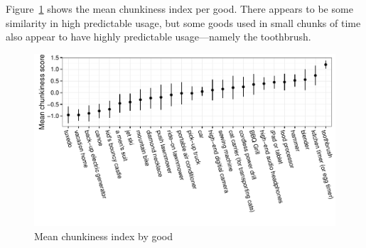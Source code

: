 \documentclass[12pt]{article}
\begin{document}
Figure~\ref{fig:granularity} shows the mean chunkiness index per good. 
There appears to be some similarity in high predictable usage, but some goods used in small chunks of time also appear to have highly predictable usage---namely the toothbrush. 

\begin{figure}
\centering 
\caption{Mean chunkiness index by good \label{fig:granularity}}
\begin{minipage}{0.90 \linewidth}
\includegraphics[width = \linewidth]{./plots/granularity.pdf} 
\end{minipage} 
\end{figure} 
\end{document}
